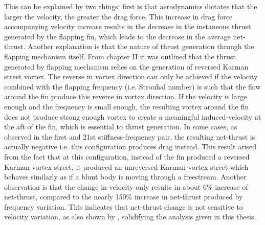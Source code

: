 This can be explained by two things: first is that aerodynamics dictates that the larger the velocity, the greater the drag force. This increase in drag force accompanying velocity increase results in the decrease in the instaneous thrust generated by the flapping fin, which leads to the decrease in the average net-thrust. Another explanation is that the nature of thrust generation through the flapping mechanism itself. From chapter II it was outlined that the thrust generated by flapping mechanism relies on the generation of reversed Karman street vortex. The reverse in vortex direction can only be achieved if the velocity combined with the flapping frequency (i.e. Strouhal number) is such that the flow around the fin produce this reverse in vortex direction. If the velocity is large enough and the frequency is small enough, the resulting vortex around the fin does not produce strong enough vortex to create a meaningful induced-velocity at the aft of the fin, which is essential to thrust generation. In some cases, as observed in the first and 21st stiffness-frequency pair, the resulting net-thrust is actually negative i.e. this configuration produces drag instead. This result arised from the fact that at this configuration, instead of the fin produced a reversed Karman vortex street, it produced an unreversed Karman vortex street which behaves similarly as if a blunt body is moving through a freestream. Another observation is that the change in velocity only results in about 6\% increase of net-thrust, compared to the nearly 150\% increase in net-thrust produced by frequency variation. This indicates that net-thrust change is not sensitive to velocity variation, as also shown by \citet{hiroki}, solidifying the analysis given in this thesis.\par